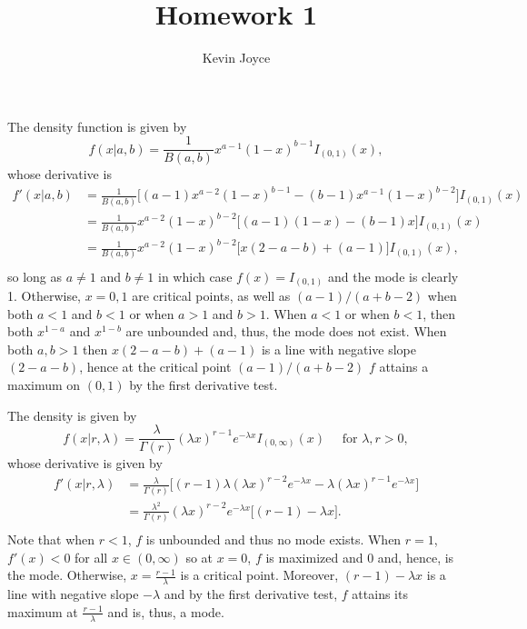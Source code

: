 \documentclass{homework}
\title{Homework 1}
\author{Kevin Joyce}
\begin{document}

  \begin{solution}
  The density function is given by 
  $$
    f(x|a,b) = \frac{1}{B(a,b)} x^{a-1}(1-x)^{b-1}I_{(0,1)}(x),
  $$
  whose derivative is 
  \begin{align*}
    f'(x|a,b) &= \frac{1}{B(a,b)} \Big[ (a-1)x^{a-2}(1-x)^{b-1} - (b-1)x^{a-1}(1-x)^{b-2}\Big]I_{(0,1)}(x) \\
	      &= \frac{1}{B(a,b)} x^{a-2}(1-x)^{b-2} \big[ (a-1)(1-x) - (b-1)x \big]I_{(0,1)}(x) \\
	      &= \frac{1}{B(a,b)} x^{a-2}(1-x)^{b-2} \big[ x(2-a-b) + (a-1)  \big]I_{(0,1)}(x), \\
  \end{align*}
  so long as $a\not=1$ and $b\not=1$ in which case $f(x) = I_{(0,1)}$ and the mode is clearly 1.  Otherwise, $x=0, 1$ are critical points, as well as $(a-1)/(a+b-2)$ when both $a<1$ and $b<1$ or when $a>1$ and $b>1$.  When $a<1$ or when $b<1$, then both $x^{1-a}$ and $x^{1-b}$ are unbounded and, thus, the mode does not exist.  When both $a,b>1$ then $x(2-a-b) + (a-1)$ is a line with negative slope $(2-a-b)$, hence at the critical point $(a-1)/(a+b-2)$ $f$ attains a maximum on $(0,1)$ by the first derivative test.
  \end{solution}

  \begin{solution}
  The density is given by
  $$
    f(x|r,\lambda) = \frac{\lambda}{\Gamma(r)} (\lambda x)^{r-1}e^{-\lambda x}I_{(0,\infty)}(x) \quad \text{ for } \lambda,r>0,
  $$
  whose derivative is given by
  \begin{align*}
    f'(x|r,\lambda) &= \frac{\lambda}{\Gamma(r)}\Big[ (r-1)\lambda(\lambda x)^{r-2}e^{-\lambda x} - \lambda (\lambda x)^{r-1}e^{-\lambda x} \Big] \\
      &= \frac{\lambda^2}{\Gamma(r)} (\lambda x)^{r-2} e^{-\lambda x}\Big[ (r-1) - \lambda x\Big]. \\
\end{align*}
  Note that when $r < 1$, $f$ is unbounded and thus no mode exists. When $ r = 1 $, $f'(x) < 0$ for all $x \in (0,\infty)$ so at $x=0$, $f$ is maximized and $0$ and, hence, is the mode.  Otherwise, $x = \frac{r-1}{\lambda}$ is a critical point. Moreover, $(r-1) - \lambda x$ is a line with negative slope $-\lambda$ and by the first derivative test, $f$ attains its maximum at $\frac{r-1}{\lambda}$ and is, thus, a mode.  
  \end{solution}
\end{document}
